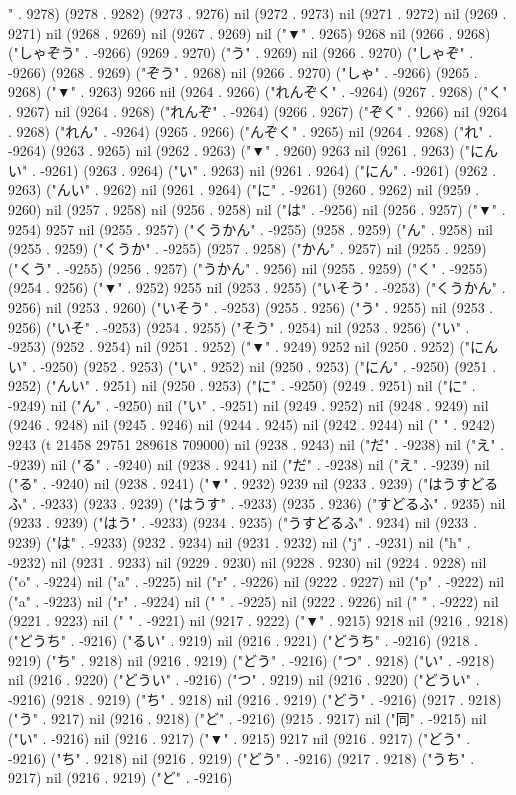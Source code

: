 " . 9278) (9278 . 9282) (9273 . 9276) nil (9272 . 9273) nil (9271 . 9272) nil (9269 . 9271) nil (9268 . 9269) nil (9267 . 9269) nil ("▼" . 9265) 9268 nil (9266 . 9268) ("しゃぞう" . -9266) (9269 . 9270) ("う" . 9269) nil (9266 . 9270) ("しゃぞ" . -9266) (9268 . 9269) ("ぞう" . 9268) nil (9266 . 9270) ("しゃ" . -9266) (9265 . 9268) ("▼" . 9263) 9266 nil (9264 . 9266) ("れんぞく" . -9264) (9267 . 9268) ("く" . 9267) nil (9264 . 9268) ("れんぞ" . -9264) (9266 . 9267) ("ぞく" . 9266) nil (9264 . 9268) ("れん" . -9264) (9265 . 9266) ("んぞく" . 9265) nil (9264 . 9268) ("れ" . -9264) (9263 . 9265) nil (9262 . 9263) ("▼" . 9260) 9263 nil (9261 . 9263) ("にんい" . -9261) (9263 . 9264) ("い" . 9263) nil (9261 . 9264) ("にん" . -9261) (9262 . 9263) ("んい" . 9262) nil (9261 . 9264) ("に" . -9261) (9260 . 9262) nil (9259 . 9260) nil (9257 . 9258) nil (9256 . 9258) nil ("は" . -9256) nil (9256 . 9257) ("▼" . 9254) 9257 nil (9255 . 9257) ("くうかん" . -9255) (9258 . 9259) ("ん" . 9258) nil (9255 . 9259) ("くうか" . -9255) (9257 . 9258) ("かん" . 9257) nil (9255 . 9259) ("くう" . -9255) (9256 . 9257) ("うかん" . 9256) nil (9255 . 9259) ("く" . -9255) (9254 . 9256) ("▼" . 9252) 9255 nil (9253 . 9255) ("いそう" . -9253) ("くうかん" . 9256) nil (9253 . 9260) ("いそう" . -9253) (9255 . 9256) ("う" . 9255) nil (9253 . 9256) ("いそ" . -9253) (9254 . 9255) ("そう" . 9254) nil (9253 . 9256) ("い" . -9253) (9252 . 9254) nil (9251 . 9252) ("▼" . 9249) 9252 nil (9250 . 9252) ("にんい" . -9250) (9252 . 9253) ("い" . 9252) nil (9250 . 9253) ("にん" . -9250) (9251 . 9252) ("んい" . 9251) nil (9250 . 9253) ("に" . -9250) (9249 . 9251) nil ("に" . -9249) nil ("ん" . -9250) nil ("い" . -9251) nil (9249 . 9252) nil (9248 . 9249) nil (9246 . 9248) nil (9245 . 9246) nil (9244 . 9245) nil (9242 . 9244) nil (" " . 9242) 9243 (t 21458 29751 289618 709000) nil (9238 . 9243) nil ("だ" . -9238) nil ("え" . -9239) nil ("る" . -9240) nil (9238 . 9241) nil ("だ" . -9238) nil ("え" . -9239) nil ("る" . -9240) nil (9238 . 9241) ("▼" . 9232) 9239 nil (9233 . 9239) ("はうすどるふ" . -9233) (9233 . 9239) ("はうす" . -9233) (9235 . 9236) ("すどるふ" . 9235) nil (9233 . 9239) ("はう" . -9233) (9234 . 9235) ("うすどるふ" . 9234) nil (9233 . 9239) ("は" . -9233) (9232 . 9234) nil (9231 . 9232) nil ("j" . -9231) nil ("h" . -9232) nil (9231 . 9233) nil (9229 . 9230) nil (9228 . 9230) nil (9224 . 9228) nil ("o" . -9224) nil ("a" . -9225) nil ("r" . -9226) nil (9222 . 9227) nil ("p" . -9222) nil ("a" . -9223) nil ("r" . -9224) nil (" " . -9225) nil (9222 . 9226) nil (" " . -9222) nil (9221 . 9223) nil (" " . -9221) nil (9217 . 9222) ("▼" . 9215) 9218 nil (9216 . 9218) ("どうち" . -9216) ("るい" . 9219) nil (9216 . 9221) ("どうち" . -9216) (9218 . 9219) ("ち" . 9218) nil (9216 . 9219) ("どう" . -9216) ("つ" . 9218) ("い" . -9218) nil (9216 . 9220) ("どうい" . -9216) ("つ" . 9219) nil (9216 . 9220) ("どうい" . -9216) (9218 . 9219) ("ち" . 9218) nil (9216 . 9219) ("どう" . -9216) (9217 . 9218) ("う" . 9217) nil (9216 . 9218) ("ど" . -9216) (9215 . 9217) nil ("同" . -9215) nil ("い" . -9216) nil (9216 . 9217) ("▼" . 9215) 9217 nil (9216 . 9217) ("どう" . -9216) ("ち" . 9218) nil (9216 . 9219) ("どう" . -9216) (9217 . 9218) ("うち" . 9217) nil (9216 . 9219) ("ど" . -9216) 